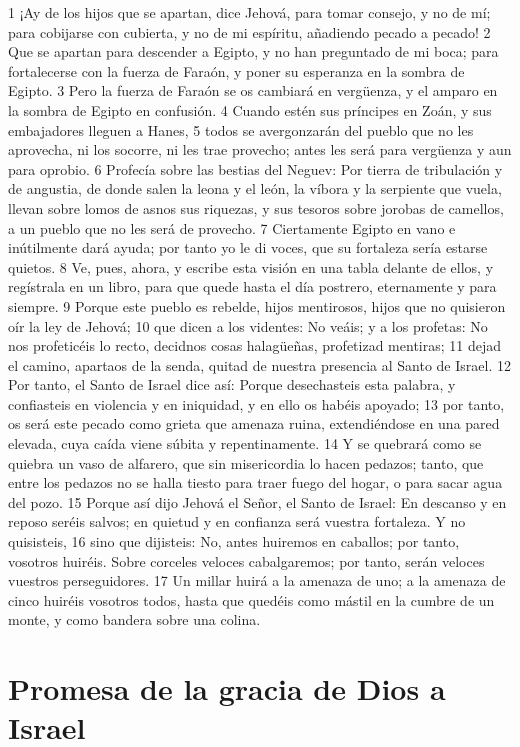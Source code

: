 1 ¡Ay de los hijos que se apartan, dice Jehová, para tomar consejo, y no de mí; para cobijarse con cubierta, y no de mi espíritu, añadiendo pecado a pecado!
2 Que se apartan para descender a Egipto, y no han preguntado de mi boca; para fortalecerse con la fuerza de Faraón, y poner su esperanza en la sombra de Egipto.
3 Pero la fuerza de Faraón se os cambiará en vergüenza, y el amparo en la sombra de Egipto en confusión.
4 Cuando estén sus príncipes en Zoán, y sus embajadores lleguen a Hanes,
5 todos se avergonzarán del pueblo que no les aprovecha, ni los socorre, ni les trae provecho; antes les será para vergüenza y aun para oprobio.
6 Profecía sobre las bestias del Neguev: Por tierra de tribulación y de angustia, de donde salen la leona y el león, la víbora y la serpiente que vuela, llevan sobre lomos de asnos sus riquezas, y sus tesoros sobre jorobas de camellos, a un pueblo que no les será de provecho.
7 Ciertamente Egipto en vano e inútilmente dará ayuda; por tanto yo le di voces, que su fortaleza sería estarse quietos.
8 Ve, pues, ahora, y escribe esta visión en una tabla delante de ellos, y regístrala en un libro, para que quede hasta el día postrero, eternamente y para siempre.
9 Porque este pueblo es rebelde, hijos mentirosos, hijos que no quisieron oír la ley de Jehová;
10 que dicen a los videntes: No veáis; y a los profetas: No nos profeticéis lo recto, decidnos cosas halagüeñas, profetizad mentiras;
11 dejad el camino, apartaos de la senda, quitad de nuestra presencia al Santo de Israel.
12 Por tanto, el Santo de Israel dice así: Porque desechasteis esta palabra, y confiasteis en violencia y en iniquidad, y en ello os habéis apoyado;
13 por tanto, os será este pecado como grieta que amenaza ruina, extendiéndose en una pared elevada, cuya caída viene súbita y repentinamente.
14 Y se quebrará como se quiebra un vaso de alfarero, que sin misericordia lo hacen pedazos; tanto, que entre los pedazos no se halla tiesto para traer fuego del hogar, o para sacar agua del pozo.
15 Porque así dijo Jehová el Señor, el Santo de Israel: En descanso y en reposo seréis salvos; en quietud y en confianza será vuestra fortaleza. Y no quisisteis,
16 sino que dijisteis: No, antes huiremos en caballos; por tanto, vosotros huiréis. Sobre corceles veloces cabalgaremos; por tanto, serán veloces vuestros perseguidores.
17 Un millar huirá a la amenaza de uno; a la amenaza de cinco huiréis vosotros todos, hasta que quedéis como mástil en la cumbre de un monte, y como bandera sobre una colina. 

\section*{Promesa de la gracia de Dios a Israel}

